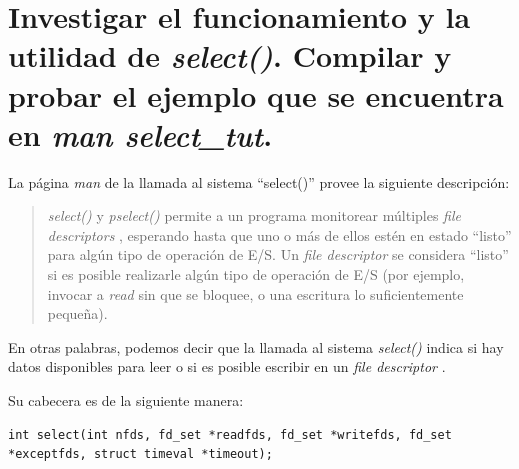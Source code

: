 \documentclass[12pt]{extarticle}
\begin{document}
    \clearpage
    \pagestyle{fancy}
    \cfoot{}
    \lfoot{\thepage}



    \newcommand\fd{\textit{file descriptor }}
    \newcommand\fds{\textit{file descriptors }}
    
    \section{Investigar el funcionamiento y la utilidad de \textit{select()}. Compilar y probar el ejemplo que se encuentra en \textit{man select\_tut}.}
    
    La página \textit{man} de la llamada al sistema ``select()'' provee la siguiente descripción:
    \begin{quote}
        \textit{select()} y \textit{pselect()} permite a un programa monitorear múltiples \fds, esperando hasta que uno o más de ellos estén en estado ``listo'' para algún tipo de operación de E/S. Un \fd se considera ``listo'' si es posible realizarle algún tipo de operación de E/S (por ejemplo, invocar a \textit{read} sin que se bloquee, o una escritura lo suficientemente pequeña).
    \end{quote}

    En otras palabras, podemos decir que la llamada al sistema \textit{select()} indica si hay datos disponibles para leer o si es posible escribir en un \fd.

    Su cabecera es de la siguiente manera:

    \vspace*{10mm}
    \begin{adjustwidth}{-45mm}{-30mm}
    \begin{lstlisting}[style=custom3c]
        int select(int nfds, fd_set *readfds, fd_set *writefds, fd_set *exceptfds, struct timeval *timeout);
    \end{lstlisting}
    \end{adjustwidth}
\end{document}
